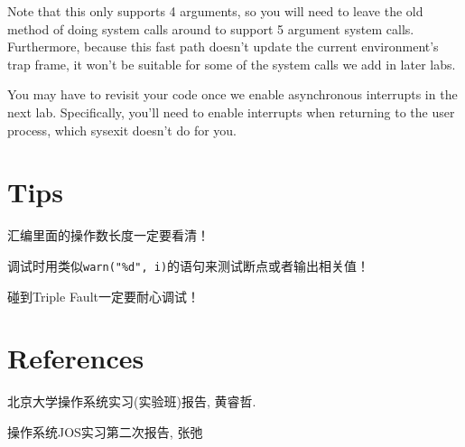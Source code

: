 \documentclass[11pt]{article}
\newenvironment{packed_enum}{
\begin{enumerate}
  \setlength{\itemsep}{1pt}
  \setlength{\parskip}{0pt}
  \setlength{\parsep}{0pt}
}{\end{enumerate}}
\begin{document}
\begin{framed}
Note that this only supports 4 arguments, so you will need to leave the old method of doing system calls around to support 5 argument system calls. Furthermore, because this fast path doesn't update the current environment's trap frame, it won't be suitable for some of the system calls we add in later labs.

You may have to revisit your code once we enable asynchronous interrupts in the next lab. Specifically, you'll need to enable interrupts when returning to the user process, which sysexit doesn't do for you. 
\end{framed}

\section{Tips}
\begin{packed_enum}
\item 汇编里面的操作数长度一定要看清！
\item 调试时用类似\lstinline|warn("%d", i)|的语句来测试断点或者输出相关值！
\item 碰到Triple Fault一定要耐心调试！
\end{packed_enum}

\section{References}
北京大学操作系统实习(实验班)报告, 黄睿哲.

操作系统JOS实习第二次报告, 张弛
\end{document}
